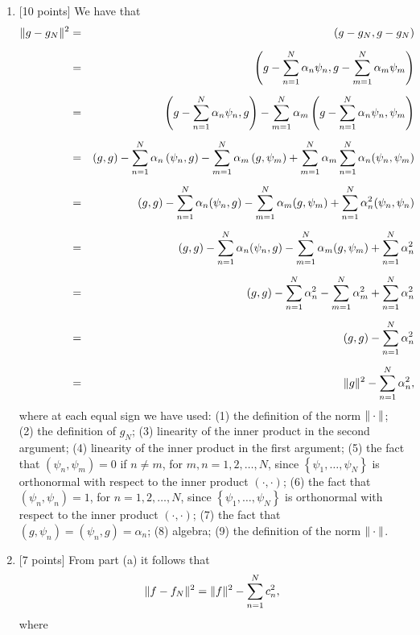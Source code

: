 \begin{solution}
\begin{enumerate}
\item {[10 points]} We have that
\begin{eqnarray*}
   \|g-g_N\|^2 &=& \left( g-g_N, g-g_N\right) \\[0.5em]
 &=& \left( g - \sum_{n=1}^N \alpha_n \psi_n,
                           g - \sum_{m=1}^N \alpha_m \psi_m\right) \\[0.5em]
 &=& \left( g - \sum_{n=1}^N \alpha_n \psi_n, g\right) 
              -\sum_{m=1}^N \alpha_m \left( g - \sum_{n=1}^N \alpha_n \psi_n,   \psi_m\right) \\[0.5em]
 &=& \left(g,g\right) - \sum_{n=1}^N \alpha_n\left( \psi_n, g\right) 
              - \sum_{m=1}^N \alpha_m\left( g,   \psi_m\right) 
           +  \sum_{m=1}^N \alpha_m \sum_{n=1}^N \alpha_n (\psi_n, \psi_m) \\[0.5em]
 &=& (g,g) - \sum_{n=1}^N \alpha_n (\psi_n, g) 
           - \sum_{m=1}^N \alpha_m (g,\psi_m)
           + \sum_{n=1}^N \alpha_n^2  (\psi_n, \psi_n)\\[0.5em]
 &=& (g,g) - \sum_{n=1}^N \alpha_n (\psi_n, g) 
           - \sum_{m=1}^N \alpha_m (g,\psi_m)
           + \sum_{n=1}^N \alpha_n^2\\[0.5em]
 &=& (g,g) - \sum_{n=1}^N \alpha_n^2  
           - \sum_{m=1}^N \alpha_m^2 
           + \sum_{n=1}^N \alpha_n^2 \\[0.5em]
 &=& (g,g) - \sum_{n=1}^N \alpha_n^2 \\[0.5em]
 &=& \|g\|^2 - \sum_{n=1}^N \alpha_n^2,
\end{eqnarray*}
where at each equal sign we have used:
(1) the definition of the norm $\|\cdot\|$;
(2) the definition of $g_N$;
(3) linearity of the inner product in the second argument;
(4) linearity of the inner product in the first argument;
(5) the fact that $(\psi_n,\psi_m) = 0$ if $n\ne m$, for $m,n=1,2,\ldots,N$, since $\left\{\psi_1,\ldots,\psi_N\right\}$ is orthonormal with respect to the inner product $(\cdot,\cdot)$;
(6) the fact that $(\psi_n,\psi_n) = 1$, for $n=1,2,\ldots,N$, since $\left\{\psi_1,\ldots,\psi_N\right\}$ is orthonormal with respect to the inner product $(\cdot,\cdot)$;
(7) the fact that $(g,\psi_n) = (\psi_n,g) = \alpha_n$;
(8) algebra;
(9) the definition of the norm $\|\cdot\|$.
\\
\item {[7 points]} From part (a) it follows that
\[
\|f-f_N\|^2 = \|f\|^2 - \sum_{n=1}^N c_n^2,
\]
where
\[
\]
\end{enumerate}
\end{solution}

